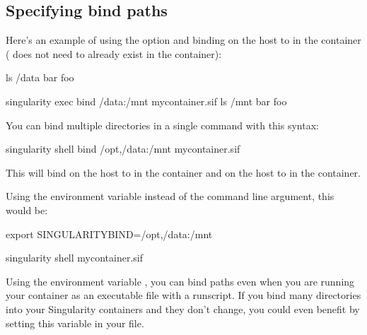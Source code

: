 \documentclass[letterpaper,10pt,english]{sphinxmanual}
\begin{document}
\subsection{Specifying bind paths}
\label{\detokenize{bind_paths_and_mounts:specifying-bind-paths}}
Here’s an example of using the  option and binding  on the
host to  in the container ( does not need to already exist in
the container):

%
\begin{sphinxVerbatim}[commandchars=\\\{\}]
\PYGZdl{} ls /data
bar  foo

\PYGZdl{} singularity exec \PYGZhy{}\PYGZhy{}bind /data:/mnt my\PYGZus{}container.sif ls /mnt
bar  foo
\end{sphinxVerbatim}

You can bind multiple directories in a single command with this syntax:

%
\begin{sphinxVerbatim}[commandchars=\\\{\}]
\PYGZdl{} singularity shell \PYGZhy{}\PYGZhy{}bind /opt,/data:/mnt my\PYGZus{}container.sif
\end{sphinxVerbatim}

This will bind  on the host to  in the container and 
on the host to  in the container.

Using the environment variable instead of the command line argument, this would
be:

%
\begin{sphinxVerbatim}[commandchars=\\\{\}]
\PYGZdl{} export SINGULARITY\PYGZus{}BIND=\PYGZdq{}/opt,/data:/mnt\PYGZdq{}

\PYGZdl{} singularity shell my\PYGZus{}container.sif
\end{sphinxVerbatim}

Using the environment variable , you can bind paths even
when you are running your container as an executable file with a runscript. If
you bind many directories into your Singularity containers and they don’t
change, you could even benefit by setting this variable in your 
file.
\end{document}
